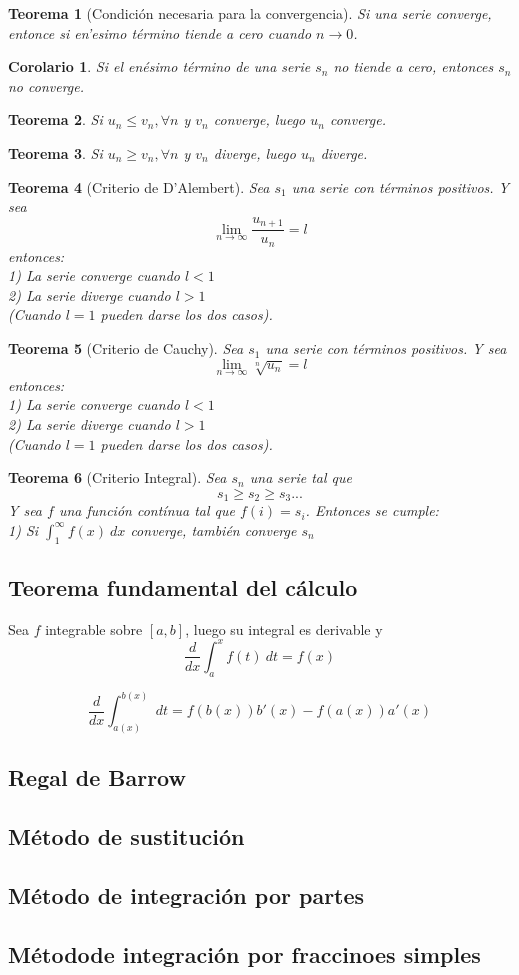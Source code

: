 \documentclass[12pt,a4paper]{extarticle}
\newtheorem{theorem}{Teorema}[section]
\newtheorem{corol}{Corolario}[theorem]
\newcommand{\limi}[4]{
  \lim_{#1 \to #2} #3 = #4
}
\begin{document}
\begin{theorem}[Condici\'on necesaria para la convergencia]
Si una serie converge, entonce si en'esimo t\'ermino tiende a cero
cuando \(n \to 0\).
\end{theorem}
\begin{corol}
Si el en\'esimo t\'ermino de una serie \(s_n\) no tiende a cero,
entonces \(s_n\) no converge.
\end{corol}
\vspace{1em}
\begin{theorem}
Si \(u_n \leq v_n, \forall n\) y \(v_n\) converge, luego \(u_n\) converge.
\end{theorem}
\begin{theorem}
Si \(u_n \geq v_n,  \forall n\) y \(v_n\) diverge, luego \(u_n\) diverge.
\end{theorem}
\begin{theorem}[Criterio de D'Alembert]
Sea \(s_1\) una serie con t\'erminos positivos. Y sea \[
\limi{n}{\infty}{\frac{u_{n+1}}{u_n}}{l} \]
entonces:\\
1) La serie converge cuando \(l < 1\)\\
2) La serie diverge cuando \(l > 1\)\\
(Cuando \(l = 1\) pueden darse los dos casos).
\end{theorem}
\begin{theorem}[Criterio de Cauchy]
Sea \(s_1\) una serie con t\'erminos positivos. Y sea \[
\limi{n}{\infty}{\sqrt[n]{u_n}}{l}\]
entonces:\\
1) La serie converge cuando \(l < 1\)\\
2) La serie diverge cuando \(l > 1\)\\
(Cuando \(l = 1\) pueden darse los dos casos).
\end{theorem}
\begin{theorem}[Criterio Integral]
Sea \(s_n\) una serie tal que
\[
s_1 \geq s_2 \geq s_3 ...
\]
Y sea \(f \) una funci\'on cont\'inua tal que \( f(i) = s_i \). Entonces se
cumple:\\
1) Si \( \int_1^{\infty} f(x) \ dx \) converge, tambi\'en converge \(s_n\)
\end{theorem}

\subsection{Teorema fundamental del c\'alculo}
Sea \(f\) integrable sobre \([a,b]\), luego su integral es derivable y
\[
\frac{d}{dx} \int_a^x f(t) \ dt = f(x)
\]

\[
\frac{d}{dx} \int_{a(x)}^{b(x)} \ dt = f(b(x))b'(x) - f(a(x))a'(x)
\]
\subsection{Regal de Barrow}
\subsection{M\'etodo de sustituci\'on}
\subsection{M\'etodo de integraci\'on por partes}
\subsection{M\'etodode integraci\'on por fraccinoes simples}
\end{document}
